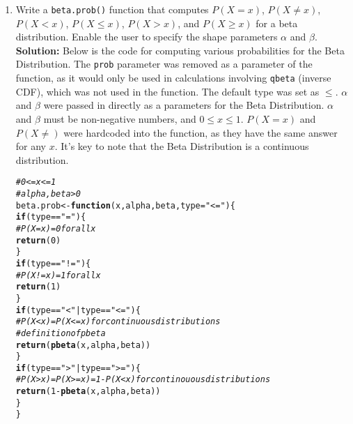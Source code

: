\documentclass{article}\usepackage[]{graphicx}\usepackage[]{xcolor}
\makeatletter
\newcommand{\hlnum}[1]{\textcolor[rgb]{0.686,0.059,0.569}{#1}}%
\newcommand{\hlsng}[1]{\textcolor[rgb]{0.192,0.494,0.8}{#1}}%
\newcommand{\hlcom}[1]{\textcolor[rgb]{0.678,0.584,0.686}{\textit{#1}}}%
\newcommand{\hlopt}[1]{\textcolor[rgb]{0,0,0}{#1}}%
\newcommand{\hldef}[1]{\textcolor[rgb]{0.345,0.345,0.345}{#1}}%
\newcommand{\hlkwa}[1]{\textcolor[rgb]{0.161,0.373,0.58}{\textbf{#1}}}%
\newcommand{\hlkwb}[1]{\textcolor[rgb]{0.69,0.353,0.396}{#1}}%
\newcommand{\hlkwc}[1]{\textcolor[rgb]{0.333,0.667,0.333}{#1}}%
\newcommand{\hlkwd}[1]{\textcolor[rgb]{0.737,0.353,0.396}{\textbf{#1}}}%
\newenvironment{kframe}{%
 \def\at@end@of@kframe{}%
 \ifinner\ifhmode%
  \def\at@end@of@kframe{\end{minipage}}%
  \begin{minipage}{\columnwidth}%
 \fi\fi%
 \def\FrameCommand##1{\hskip\@totalleftmargin \hskip-\fboxsep
 \colorbox{shadecolor}{##1}\hskip-\fboxsep
     \hskip-\linewidth \hskip-\@totalleftmargin \hskip\columnwidth}%
 \MakeFramed {\advance\hsize-\width
   \@totalleftmargin\z@ \linewidth\hsize
   \@setminipage}}%
 {\par\unskip\endMakeFramed%
 \at@end@of@kframe}
\newenvironment{knitrout}{}{} %
\makeatother
\begin{document}
\begin{enumerate}
\begin{knitrout}
\begin{kframe}
\begin{alltt}
  \hldef{\}}
\hldef{\}}
\end{alltt}
\end{kframe}
\end{knitrout}
    \item Write a \texttt{beta.prob()} function that computes $P(X=x)$, 
    $P(X \neq x)$, $P(X<x)$, $P(X \leq x)$, $P(X > x)$, and $P(X \geq x)$
    for a beta distribution. Enable the user to specify the shape parameters
    $\alpha$ and $\beta$. \\
    \textbf{Solution:} Below is the code for computing various probabilities for the Beta Distribution. The \texttt{prob} parameter was removed as a parameter of the function, as it would only be used in calculations involving \texttt{qbeta} (inverse CDF), which was not used in the function. The default type was set as $\leq$. $\alpha$ and $\beta$ were passed in directly as a parameters for the Beta Distribution. $\alpha$ and $\beta$ must be non-negative numbers, and $0 \leq x \leq 1$. $P(X = x)$ and $P(X \neq)$ were hardcoded into the function, as they have the same answer for any $x$. It's key to note that the Beta Distribution is a continuous distribution. 
\begin{knitrout}\scriptsize
{}\color{fgcolor}\begin{kframe}
\begin{alltt}
\hlcom{# 0 <= x <= 1}
\hlcom{# alpha, beta > 0}
\hldef{beta.prob} \hlkwb{<-} \hlkwa{function}\hldef{(}\hlkwc{x}\hldef{,} \hlkwc{alpha}\hldef{,} \hlkwc{beta}\hldef{,} \hlkwc{type}\hldef{=}\hlsng{"<="}\hldef{)\{}
  \hlkwa{if} \hldef{(type} \hlopt{==} \hlsng{"="}\hldef{)\{}
    \hlcom{# P(X = x) = 0 for all x}
    \hlkwd{return}\hldef{(}\hlnum{0}\hldef{)}
  \hldef{\}}
  \hlkwa{if} \hldef{(type} \hlopt{==} \hlsng{"!="}\hldef{)\{}
    \hlcom{# P(X != x) = 1 for all x}
    \hlkwd{return}\hldef{(}\hlnum{1}\hldef{)}
  \hldef{\}}
  \hlkwa{if}\hldef{(type} \hlopt{==} \hlsng{"<"} \hlopt{|} \hldef{type} \hlopt{==} \hlsng{"<="}\hldef{)\{}
    \hlcom{# P(X < x) = P(X <= x) for continuous distributions}
    \hlcom{# definition of pbeta}
    \hlkwd{return}\hldef{(}\hlkwd{pbeta}\hldef{(x, alpha, beta))}
  \hldef{\}}
  \hlkwa{if} \hldef{(type} \hlopt{==} \hlsng{">"} \hlopt{|} \hldef{type} \hlopt{==} \hlsng{">="}\hldef{)\{}
    \hlcom{# P(X > x) = P(X >= x) = 1 - P(X < x)for continouous distributions }
    \hlkwd{return}\hldef{(}\hlnum{1} \hlopt{-} \hlkwd{pbeta}\hldef{(x, alpha, beta))}
  \hldef{\}}
\hldef{\}}
\end{alltt}
\end{kframe}
\end{knitrout}
\end{enumerate}

\end{document}
